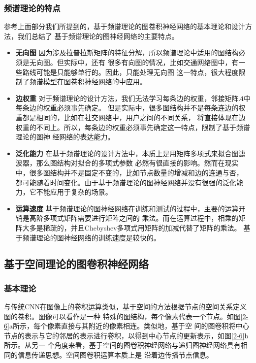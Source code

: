 \subsubsection{频谱理论的特点}
参考上面部分我们所提到的，基于频谱理论的图卷积神经网络的基本理论和设计方法，我们总结了
基于频谱理论的图神经网络的主要特点。
\begin{itemize}
    \item \textbf{无向图} \quad
    因为涉及拉普拉斯矩阵的特征分解，所以频谱理论中适用的图结构必须是无向图。但实际中，还有
    很多有向图的情况，比如交通网络图中，有一些路线可能是只能够单行的。因此，只能处理无向图
    这一特点，很大程度限制了频谱模型在图卷积神经网络的中应用。
    
    \item \textbf{边权重} \quad
    对于频谱理论的设计方法，我们无法学习每条边的权重，邻接矩阵$A$中每条边的权重必须事先确定。
    但是实际中，很多图结构并不是每条连边的权重都是相同的，比如在社交网络中，用户之间的不同关系，
    将直接体现在边权重的不同上。所以，每条边的权重必须事先确定这一特点，限制了基于频谱理论的图神
    经网络的表达能力。

    \item \textbf{泛化能力} \quad
    在基于频谱理论的设计方法中，本质上是用矩阵多项式来拟合图滤波器，那么图结构对拟合的多项式参数
    必然有很直接的影响。然而在现实中，很多图结构并不是固定不变的，比如节点数量的增减和边的连通与否，
    都可能随着时间变化。由于基于频谱理论的图神经网络并没有很强的泛化能力，它不能应用于复杂的场景。

    \item \textbf{运算速度} \quad
    基于频谱理论的图神经网络在训练和测试的过程中，主要的运算开销是高阶多项式矩阵需要进行矩阵之间的
    乘法。而在运算过程中，相乘的矩阵大多是稀疏的，并且Chebyshev多项式用矩阵的加减代替了矩阵的乘法。
    基于频谱理论的图神经网络的训练速度是较快的。
\end{itemize}

\subsection{基于空间理论的图卷积神经网络}
\subsubsection{基本理论}
与传统CNN在图像上的卷积运算类似，基于空间的方法根据节点的空间关系定义图的卷积。图像可以看作是一种
特殊的图结构，每个像素代表一个节点。如图\ref{2-6}a所示，每个像素直接与其附近的像素相连。类似地，基于空
间的图卷积将中心节点的表示与它的邻居的表示进行卷积，以得到中心节点的更新表示，如图\ref{2-6}b所示。从另一
个角度来看，基于空间的图卷积神经网络与递归图神经网络具有相同的信息传递思想。空间图卷积运算本质上是
沿着边传播节点信息。

